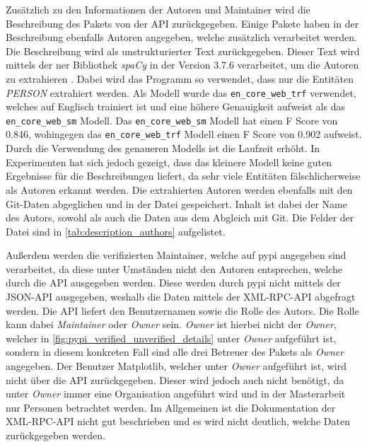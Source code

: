 Zusätzlich zu den Informationen der Autoren und Maintainer wird die Beschreibung des Pakets von der API zurückgegeben.
Einige Pakete haben in der Beschreibung ebenfalls Autoren angegeben, welche zusätzlich verarbeitet werden.
Die Beschreibung wird als unstrukturierter Text zurückgegeben.
Dieser Text wird mittels der \gls{ner} Bibliothek \emph{spaCy} in der Version 3.7.6 verarbeitet, um die Autoren zu extrahieren \autocite{honnibal_spacy_2020}.
Dabei wird das Programm so verwendet, dass nur die Entitäten \emph{PERSON} extrahiert werden.
Als Modell wurde das \texttt{en\_core\_web\_trf} verwendet, welches auf Englisch trainiert ist und eine höhere Genauigkeit aufweist als das \texttt{en\_core\_web\_sm} Modell.
Das \texttt{en\_core\_web\_sm} Modell hat einen F Score von 0.846, wohingegen das \texttt{en\_core\_web\_trf} Modell einen F Score von 0.902 aufweist.
Durch die Verwendung des genaueren Modells ist die Laufzeit erhöht. 
In Experimenten hat sich jedoch gezeigt, dass das kleinere Modell keine guten Ergebnisse für die Beschreibungen liefert, da sehr viele Entitäten fälschlicherweise als Autoren erkannt werden.
Die extrahierten Autoren werden ebenfalls mit den Git-Daten abgeglichen und in der Datei  gespeichert.
Inhalt ist dabei der Name des Autors, sowohl als auch die Daten aus dem Abgleich mit Git.
Die Felder der Datei sind in \autoref{tab:description_authors} aufgelistet.

Außerdem werden die verifizierten Maintainer, welche auf \gls{pypi} angegeben sind verarbeitet, da diese unter Umständen nicht den Autoren entsprechen, welche durch die API ausgegeben werden.
Diese werden durch \gls{pypi} nicht mittels der JSON-API ausgegeben, weshalb die Daten mittels der XML-RPC-API abgefragt werden.
Die API liefert den Benutzernamen sowie die Rolle des Autors.
Die Rolle kann dabei \emph{Maintainer} oder \emph{Owner} sein.
\emph{Owner} ist hierbei nicht der \emph{Owner}, welcher in \autoref{fig:pypi_verified_unverified_details} unter \emph{Owner} aufgeführt ist, sondern in diesem konkreten Fall sind alle drei Betreuer des Pakets als \emph{Owner} angegeben.
Der Benutzer \grqq Matplotlib\glqq{}, welcher unter \emph{Owner} aufgeführt ist, wird nicht über die API zurückgegeben.
Dieser wird jedoch auch nicht benötigt, da unter \emph{Owner} immer eine Organisation angeführt wird und in der Masterarbeit nur Personen betrachtet werden.
Im Allgemeinen ist die Dokumentation der XML-RPC-API nicht gut beschrieben und es wird nicht deutlich, welche Daten zurückgegeben werden.

